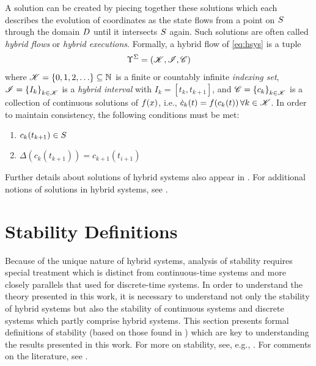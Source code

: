 A solution can be created by piecing together these solutions which each
describes the evolution of coordinates as the state flows from a point on
$S$ through the domain $D$ until it intersects $S$ again.
%
Such solutions are often called {\em hybrid flows} or {\em hybrid executions}.
%
Formally, a hybrid flow of \eqref{eq:hsys} is a tuple
\begin{align*}
  \Upsilon^{\Sigma} = \left( \mathscr{K}, \mathscr{I}, \mathscr{C} \right)
\end{align*}
where $\mathscr{K} = \{0, 1, 2, \ldots\} \subseteq \mathbb{N}$ is a finite or countably
infinite {\em indexing set}, $\mathscr{I} = \left\{I_{k}\right\}_{k \in \mathscr{K}}$ is a {\em
  hybrid interval} with $I_{k} = \left[t_{k}, t_{k+1}\right]$, and $\mathscr{C} =
\left\{c_{k}\right\}_{k \in \mathscr{K}}$ is a collection of continuous solutions of
$f(x)$, i.e., ${\dot c}_{k}(t) = f(c_{k}(t)) \, \forall k \in \mathscr{K}$.
%
In order to maintain consistency, the following conditions must be met:
%
\begin{enumerate}
\item $c_{k}(t_{k+1}) \in S$
\item $\Delta(c_{k}(t_{k+1})) = c_{k+1}(t_{i+1})$
\end{enumerate}

Further details about solutions of hybrid systems also appear in
.
%
For additional notions of solutions in hybrid systems, see \cite{Filippov1988,
  Goebel2009, Haddad2001, Lygeros2003, Ye1998}.


\section{Stability Definitions} \label{sec:hsys-stability}

Because of the unique nature of hybrid systems, analysis of stability requires
special treatment which is distinct from continuous-time systems and more
closely parallels that used for discrete-time systems.
%
In order to understand the theory presented in this work, it is necessary to
understand not only the stability of hybrid systems but also the stability of
continuous systems and discrete systems which partly comprise hybrid systems.
%
This section presents formal definitions of stability (based on
those found in \cite[Ch. 4]{Khalil2002}) which are key to understanding the
results presented in this work.
%
For more on stability, see, e.g., \cite{Khalil2002, Teschl2012,
  Vidyasagar1993}.
%
For comments on the literature, see .


